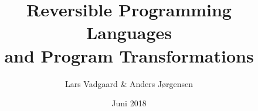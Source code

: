 \documentclass[12pt,twoside,openright,pdftex]{report}
\begin{document}
\title{%
  Reversible Programming Languages\\
  and Program Transformations
}%
\author{Lars Vadgaard \& Anders Jørgensen}
\date{Juni 2018}%


\maketitle
\clearpage\maketitle
\thispagestyle{empty}
\newpage
\setcounter{page}{1}



\tableofcontents









\newpage
\printbibliography[heading=bibintoc,title={References}]
\end{document}
